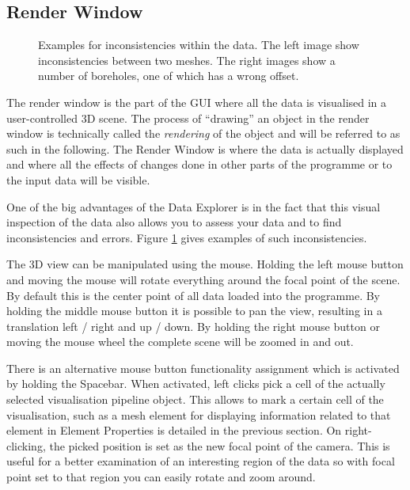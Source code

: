 \subsection{Render Window}
\label{RenderWindow}

\begin{figure}[tb]
\begin{center}
\enspace
{}
\end{center}
\caption{Examples for inconsistencies within the data. The left image show inconsistencies between two meshes. The right images show a number of boreholes, one of which has a wrong offset.} \label{fig:error}
\end{figure}

The render window is the part of the GUI where all the data is visualised in a user-controlled 3D scene. The process of ``drawing'' an object in the render window is technically called the \emph{rendering} of the object and will be referred to as such in the following. The Render Window is where the data is actually displayed and where all the effects of changes done in other parts of the programme or to the input data will be visible.

One of the big advantages of the Data Explorer is in the fact that this visual inspection of the data also allows you to assess your data and to find inconsistencies and errors. Figure \ref{fig:error} gives examples of such inconsistencies.

The 3D view can be manipulated using the mouse. Holding the left mouse button and moving the mouse will rotate everything around the focal point of the scene. By default this is the center point of all data loaded into the programme. By holding the middle mouse button it is possible to pan the view, resulting in a translation left / right and up / down. By holding the right mouse button or moving the mouse wheel the complete scene will be zoomed in and out.

There is an alternative mouse button functionality assignment which is activated by holding the Spacebar. When activated, left clicks pick a cell of the actually selected visualisation pipeline object. This allows to mark a certain cell of the visualisation, such as a mesh element for displaying information related to that element in Element Properties is detailed in the previous section. On right-clicking, the picked position is set as the new focal point of the camera. This is useful for a better examination of an interesting region of the data so with focal point set to that region you can easily rotate and zoom around.

